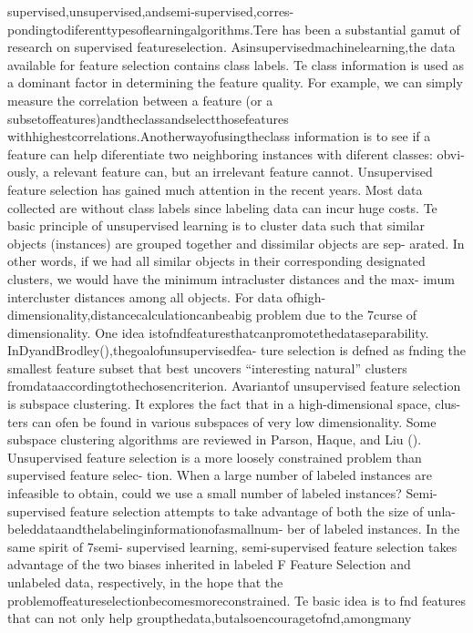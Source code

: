 supervised,unsupervised,andsemi-supervised,corres-
pondingtodiferenttypesoflearningalgorithms.Tere
has been a substantial gamut of research on supervised
featureselection.
Asinsupervisedmachinelearning,the
data available for feature selection contains class labels.
Te class information is used as a dominant factor in
determining the feature quality. For example, we can
simply measure the correlation between a feature (or a
subsetoffeatures)andtheclassandselectthosefeatures
withhighestcorrelations.Anotherwayofusingtheclass
information is to see if a feature can help diferentiate
two neighboring instances with diferent classes: obvi-
ously, a relevant feature can, but an irrelevant feature
cannot.
Unsupervised feature selection has gained much
attention in the recent years. 
Most data collected are
without class labels since labeling data can incur huge
costs. Te basic principle of unsupervised learning is
to cluster data such that similar objects (instances)
are grouped together and dissimilar objects are sep-
arated. In other words, if we had all similar objects
in their corresponding designated clusters, we would
have the minimum intracluster distances and the max-
imum intercluster distances among all objects. For data
ofhigh-dimensionality,distancecalculationcanbeabig
problem due to the 7curse of dimensionality. 
One idea
istofndfeaturesthatcanpromotethedataseparability.
InDyandBrodley(),thegoalofunsupervisedfea-
ture selection is defned as fnding the smallest feature
subset that best uncovers “interesting natural” clusters
fromdataaccordingtothechosencriterion.
Avariantof
unsupervised feature selection is subspace clustering. It
explores the fact that in a high-dimensional space, clus-
ters can ofen be found in various subspaces of very low
dimensionality. 
Some subspace clustering algorithms
are reviewed in Parson, Haque, and Liu ().
Unsupervised feature selection is a more loosely
constrained problem than supervised feature selec-
tion. 
When a large number of labeled instances are
infeasible to obtain, could we use a small number
of labeled instances? Semi-supervised feature selection
attempts to take advantage of both the size of unla-
beleddataandthelabelinginformationofasmallnum-
ber of labeled instances. 
In the same spirit of 7semi-
supervised learning, semi-supervised feature selection
takes advantage of the two biases inherited in labeled
 F Feature Selection
and unlabeled data, respectively, in the hope that the
problemoffeatureselectionbecomesmoreconstrained.
Te basic idea is to fnd features that can not only help
groupthedata,butalsoencouragetofnd,amongmany
